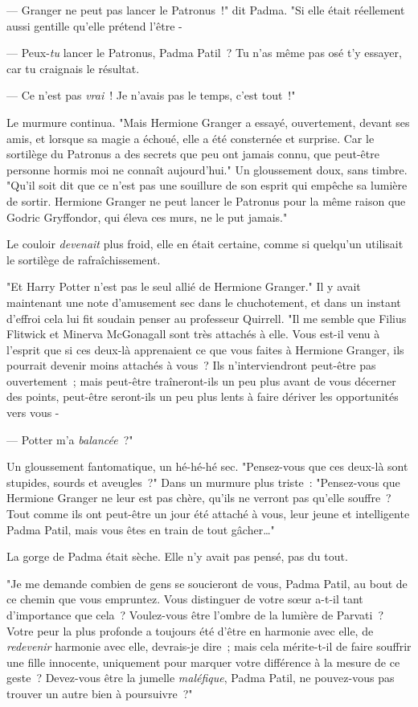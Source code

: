 --- Granger ne peut pas lancer le Patronus~!" dit Padma. "Si elle était réellement aussi gentille qu'elle prétend l'être -

--- Peux-\emph{tu} lancer le Patronus, Padma Patil~? Tu n'as même pas osé t'y essayer, car tu craignais le résultat.

--- Ce n'est pas \emph{vrai}~! Je n'avais pas le temps, c'est tout~!"

Le murmure continua. "Mais Hermione Granger a essayé, ouvertement, devant ses amis, et lorsque sa magie a échoué, elle a été consternée et surprise. Car le sortilège du Patronus a des secrets que peu ont jamais connu, que peut-être personne hormis moi ne connaît aujourd'hui." Un gloussement doux, sans timbre. "Qu'il soit dit que ce n'est pas une souillure de son esprit qui empêche sa lumière de sortir. Hermione Granger ne peut lancer le Patronus pour la même raison que Godric Gryffondor, qui éleva ces murs, ne le put jamais."

Le couloir \emph{devenait} plus froid, elle en était certaine, comme si quelqu'un utilisait le sortilège de rafraîchissement.

"Et Harry Potter n'est pas le seul allié de Hermione Granger." Il y avait maintenant une note d'amusement sec dans le chuchotement, et dans un instant d'effroi cela lui fit soudain penser au professeur Quirrell. "Il me semble que Filius Flitwick et Minerva McGonagall sont très attachés à elle. Vous est-il venu à l'esprit que si ces deux-là apprenaient ce que vous faites à Hermione Granger, ils pourrait devenir moins attachés à vous~? Ils n'interviendront peut-être pas ouvertement~; mais peut-être traîneront-ils un peu plus avant de vous décerner des points, peut-être seront-ils un peu plus lents à faire dériver les opportunités vers vous -

--- Potter m'a \emph{balancée}~?"

Un gloussement fantomatique, un hé-hé-hé sec. "Pensez-vous que ces deux-là sont stupides, sourds et aveugles~?" Dans un murmure plus triste~: "Pensez-vous que Hermione Granger ne leur est pas chère, qu'ils ne verront pas qu'elle souffre~? Tout comme ils ont peut-être un jour été attaché à vous, leur jeune et intelligente Padma Patil, mais vous êtes en train de tout gâcher…"

La gorge de Padma était sèche. Elle n'y avait pas pensé, pas du tout.

"Je me demande combien de gens se soucieront de vous, Padma Patil, au bout de ce chemin que vous empruntez. Vous distinguer de votre sœur a-t-il tant d'importance que cela~? Voulez-vous être l'ombre de la lumière de Parvati~? Votre peur la plus profonde a toujours été d'être en harmonie avec elle, de \emph{redevenir} harmonie avec elle, devrais-je dire~; mais cela mérite-t-il de faire souffrir une fille innocente, uniquement pour marquer votre différence à la mesure de ce geste~? Devez-vous être la jumelle \emph{maléfique}, Padma Patil, ne pouvez-vous pas trouver un autre bien à poursuivre~?"

